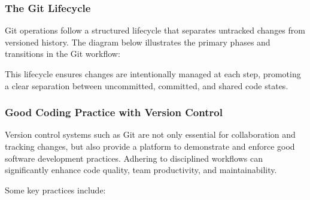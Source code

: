 \documentclass{article}
\begin{document}
\subsubsection{The Git Lifecycle}

Git operations follow a structured lifecycle that separates untracked changes from versioned history. The diagram below illustrates the primary phases and transitions in the Git workflow:

\begin{center}
\end{center}

This lifecycle ensures changes are intentionally managed at each step, promoting a clear separation between uncommitted, committed, and shared code states.

\subsubsection{Good Coding Practice with Version Control}

Version control systems such as Git are not only essential for collaboration and tracking changes, but also provide a platform to demonstrate and enforce good software development practices. Adhering to disciplined workflows can significantly enhance code quality, team productivity, and maintainability.

Some key practices include:
\end{document}
